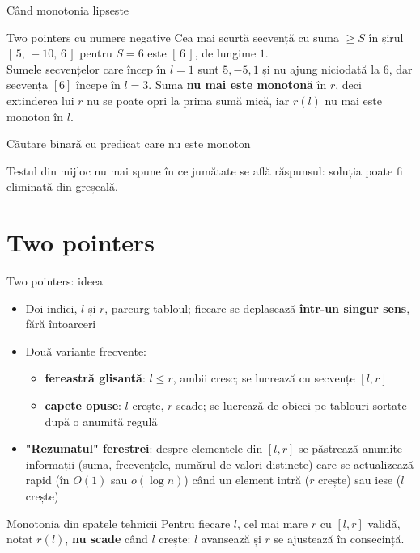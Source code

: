 \documentclass[8pt,mathserif]{beamer}
\begin{document}
\begin{frame}{Când monotonia lipsește}
  \begin{alertblock}{Two pointers cu numere negative}
    Cea mai scurtă secvență cu suma $\ge S$ în șirul $[\,5,\,-10,\,6\,]$ pentru $S = 6$ este $[\,6\,]$, de lungime $1$.\\
    Sumele secvențelor care încep în $l = 1$ sunt $5, -5, 1$ și nu ajung niciodată la $6$, dar secvența $[6]$ începe în $l = 3$. Suma \textbf{nu mai este monotonă} în $r$, deci extinderea lui $r$ nu se poate opri la prima sumă mică, iar $r(l)$ nu mai este monoton în $l$.
  \end{alertblock}
  \begin{alertblock}{Căutare binară cu predicat care nu este monoton}
    \begin{center}
    \end{center}
    Testul din mijloc nu mai spune în ce jumătate se află răspunsul: soluția poate fi eliminată din greșeală.
  \end{alertblock}
\end{frame}

\section{Two pointers}

\begin{frame}{Two pointers: ideea}
  \begin{itemize}
    \item Doi indici, $l$ și $r$, parcurg tabloul; fiecare se deplasează \textbf{într-un singur sens}, fără întoarceri
    \item Două variante frecvente:
      \begin{itemize}
        \item \textbf{fereastră glisantă}: $l \le r$, ambii cresc; se lucrează cu secvențe $[l, r]$
        \item \textbf{capete opuse}: $l$ crește, $r$ scade; se lucrează de obicei pe tablouri sortate după o anumită regulă
      \end{itemize}
    \item \textbf{"Rezumatul" ferestrei}: despre elementele din $[l, r]$ se păstrează anumite informații (suma, frecvențele, numărul de valori distincte) care se actualizează rapid (în $O(1)$ sau $o(\log n)$) când un element intră ($r$ crește) sau iese ($l$ crește)
  \end{itemize}
  \begin{block}{Monotonia din spatele tehnicii}
    Pentru fiecare $l$, cel mai mare $r$ cu $[l, r]$ validă, notat $r(l)$, \textbf{nu scade} când $l$ crește: $l$ avansează și $r$ se ajustează în consecință.
  \end{block}
\end{frame}
\end{document}
